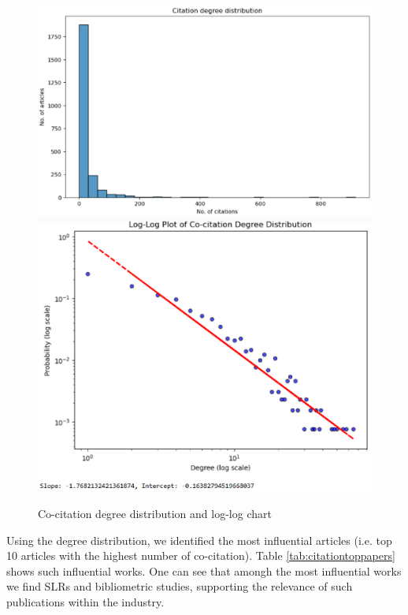 \documentclass[a4paper, review, endfloat, doubleblind, authoryear]{elsarticle}
\begin{document}
	\begin{figure}[htbp]
		\centering
		\includegraphics[height=0.2\textheight, keepaspectratio]{pics/citation_degree_distribution.eps}
		\includegraphics[height=0.2\textheight, keepaspectratio]{pics/loglog_citation_degree_distribution.eps}
		\caption{Co-citation degree distribution and log-log chart} \label{fig:fig8}
	\end{figure}
	
	Using the degree distribution, we identified the most influential articles (i.e. top 10 articles with the highest number of co-citation). Table \ref{tab:citationtoppapers} shows such influential works. One can see that amongh the most influential works we find SLRs and bibliometric studies, supporting the relevance of such publications within the industry.
	
\end{document}
